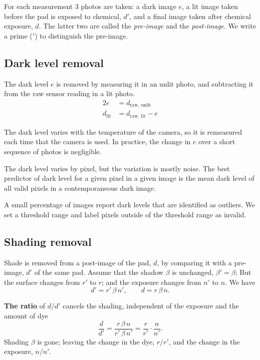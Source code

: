 \documentclass[11pt,letter]{article}
\begin{document}
For each measurement 3 photos are taken:  
a dark image $e$, 
a lit image taken before the pad is exposed to chemical, $d'$, 
and a final image taken after chemical exposure, $d$. 
The latter two are called the \textit{pre-image} and the \textit{post-image}. 
We write a prime ($'$) to distinguish the pre-image. 

\subsection{Dark level removal}

The dark level $e$ is removed by measuring it in an unlit photo, and subtracting it from the raw sensor reading in a lit photo.
\begin{alignat}{2}
	e & = d_\text{raw, unlit}  \\
	d_\text{lit} & = d_\text{raw, lit} - e
\end{alignat}

The dark level varies with the temperature of the camera, so it is remeasured each time that the camera is used.
In practice, the change in $e$ over a short sequence of photos is negligible.

The dark level varies by pixel, but the variation is mostly noise. 
The best predictor of dark level for a given pixel in a given image is the mean dark level of all valid pixels in a contemporaneous dark image.   

A small percentage of images report dark levels that are identified as outliers.
We set a threshold range and label pixels outside of the threshold range as invalid.

\subsection{Shading removal}

Shade is removed from a post-image of the pad, $d$, by comparing it with a pre-image, $d'$ of the same pad.
Assume that the shadow $\beta$ is unchanged, $\beta' = \beta$; 
But the surface changes from $r'$ to $r$; 
and the exposure changes from $n'$ to $n$.
We have
\begin{equation}
  d' = r'\, \beta\, n', \qquad d = r\, \beta\, n .
  \label{eq:te}
\end{equation}

\noindent\textbf{The ratio} of $d / d'$ cancels the shading, independent of the exposure and the amount of dye 
\begin{equation}
  \frac{d}{d'} = \frac{r\, \beta\, n}{r'\, \beta\, n'}
  = \frac{r}{r'} \cdot \frac{n}{n'} .
  \label{eq:te-ratio}
\end{equation}
Shading $\beta$ is gone;  
leaving the change in the dye, $r/r'$, 
and the change in the exposure, $n/n'$.
\end{document}
